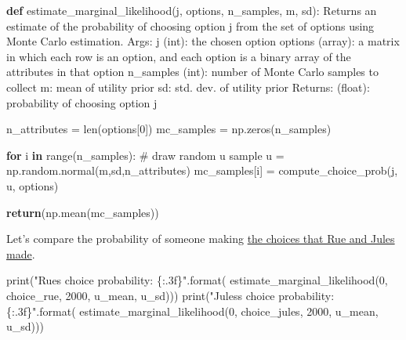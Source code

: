 \documentclass[
  letterpaper,
  DIV=11,
  numbers=noendperiod]{scrreprt}
\newenvironment{Shaded}{\begin{snugshade}}{\end{snugshade}}
\newcommand{\BuiltInTok}[1]{\textcolor[rgb]{0.00,0.23,0.31}{#1}}
\newcommand{\CommentTok}[1]{\textcolor[rgb]{0.37,0.37,0.37}{#1}}
\newcommand{\ControlFlowTok}[1]{\textcolor[rgb]{0.00,0.23,0.31}{\textbf{#1}}}
\newcommand{\DecValTok}[1]{\textcolor[rgb]{0.68,0.00,0.00}{#1}}
\newcommand{\KeywordTok}[1]{\textcolor[rgb]{0.00,0.23,0.31}{\textbf{#1}}}
\newcommand{\NormalTok}[1]{\textcolor[rgb]{0.00,0.23,0.31}{#1}}
\newcommand{\OperatorTok}[1]{\textcolor[rgb]{0.37,0.37,0.37}{#1}}
\newcommand{\SpecialCharTok}[1]{\textcolor[rgb]{0.37,0.37,0.37}{#1}}
\newcommand{\StringTok}[1]{\textcolor[rgb]{0.13,0.47,0.30}{#1}}
\begin{document}
\begin{Shaded}
\begin{Highlighting}[]
\KeywordTok{def}\NormalTok{ estimate\_marginal\_likelihood(j, options, n\_samples, m, sd): }
  \CommentTok{\textquotesingle{}\textquotesingle{}\textquotesingle{}}
\CommentTok{  Returns an estimate of the probability of choosing option j}
\CommentTok{     from the set of options using Monte Carlo estimation.}
\CommentTok{     }
\CommentTok{   Args:}
\CommentTok{    j (int): the chosen option}
\CommentTok{    options (array): a matrix in which each row is an}
\CommentTok{     option, and each option is a binary array of the }
\CommentTok{     attributes in that option}
\CommentTok{    n\_samples (int): number of Monte Carlo samples to}
\CommentTok{     collect}
\CommentTok{    m: mean of utility prior}
\CommentTok{    sd: std. dev. of utility prior}
\CommentTok{      }
\CommentTok{       }
\CommentTok{   Returns:}
\CommentTok{    (float): probability of choosing option j}
\CommentTok{  \textquotesingle{}\textquotesingle{}\textquotesingle{}}
  
\NormalTok{  n\_attributes }\OperatorTok{=} \BuiltInTok{len}\NormalTok{(options[}\DecValTok{0}\NormalTok{])}
\NormalTok{  mc\_samples }\OperatorTok{=}\NormalTok{ np.zeros(n\_samples)}
  
  \ControlFlowTok{for}\NormalTok{ i }\KeywordTok{in} \BuiltInTok{range}\NormalTok{(n\_samples):}
    \CommentTok{\# draw random u sample}
\NormalTok{    u }\OperatorTok{=}\NormalTok{ np.random.normal(m,sd,n\_attributes)}
\NormalTok{    mc\_samples[i] }\OperatorTok{=}\NormalTok{ compute\_choice\_prob(j, u, options)}
  
  \ControlFlowTok{return}\NormalTok{(np.mean(mc\_samples))}
\end{Highlighting}
\end{Shaded}

Let's compare the probability of someone making
\hyperref[inverting-the-choice-model]{the choices that Rue and Jules
made}.

\begin{Shaded}
\begin{Highlighting}[]
\BuiltInTok{print}\NormalTok{(}\StringTok{"Rue\textquotesingle{}s choice probability: }\SpecialCharTok{\{:.3f\}}\StringTok{"}\NormalTok{.}\BuiltInTok{format}\NormalTok{(}
\NormalTok{  estimate\_marginal\_likelihood(}\DecValTok{0}\NormalTok{, choice\_rue, }\DecValTok{2000}\NormalTok{, u\_mean, u\_sd)))}
\BuiltInTok{print}\NormalTok{(}\StringTok{"Jules\textquotesingle{}s choice probability: }\SpecialCharTok{\{:.3f\}}\StringTok{"}\NormalTok{.}\BuiltInTok{format}\NormalTok{(}
\NormalTok{  estimate\_marginal\_likelihood(}\DecValTok{0}\NormalTok{, choice\_jules, }\DecValTok{2000}\NormalTok{, u\_mean, u\_sd)))}
\end{Highlighting}
\end{Shaded}
\end{document}
